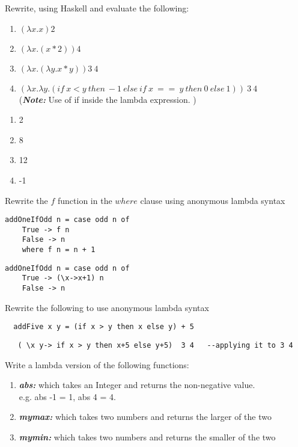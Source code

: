 \documentclass{article}
\begin{document}
\begin{Exercise}
Rewrite, using Haskell and evaluate the following: 
\begin{enumerate}
\item $(\lambda x.x) 2$
\item $(\lambda x . (x*2) ) 4$
\item $ (\lambda x . (\lambda y. x*y) ) 3 \ 4$
\item$ (\lambda x . \lambda y .( if \ x < y \ then \ -1\  else\  if\  x\  ==\ y\  then\  0\  else\  1)) \ 3\  4$\\
(\textbf{\textit{Note:}} Use of if inside the lambda expression. )

\end{enumerate}
\end{Exercise}
\begin{Answer}
\begin{enumerate}
\item 2
\item 8
\item 12
\item -1
\end{enumerate}
\end{Answer}
\begin{Exercise}
Rewrite the $f$ function in the $where$ clause using anonymous lambda syntax 
\begin{lstlisting}
addOneIfOdd n = case odd n of 
    True -> f n 
    False -> n 
    where f n = n + 1
\end{lstlisting}
\end{Exercise}
\begin{Answer}
  \begin{lstlisting}
addOneIfOdd n = case odd n of 
    True -> (\x->x+1) n 
    False -> n 
    \end{lstlisting}
\end{Answer}
\begin{Exercise}
  Rewrite the following to use anonymous lambda syntax 
  \begin{lstlisting}
  addFive x y = (if x > y then x else y) + 5
\end{lstlisting}
\end{Exercise}
\begin{Answer}
  \begin{lstlisting}
   ( \x y-> if x > y then x+5 else y+5)  3 4   --applying it to 3 4
  \end{lstlisting}
\end{Answer}
\begin{Exercise}
Write a lambda version of the following functions: 
\begin{enumerate}
\item  \textbf{\textit{abs:}} which takes an Integer and returns the non-negative value. \\
e.g. abs -1 = 1, abs 4 = 4.
\item \textbf{\textit{mymax:}} which takes two numbers and returns the larger of the two \\
\item \textbf{\textit{mymin:}} which takes two numbers and returns the smaller of the two \\
\end{enumerate}
\end{Exercise}
\end{document}
